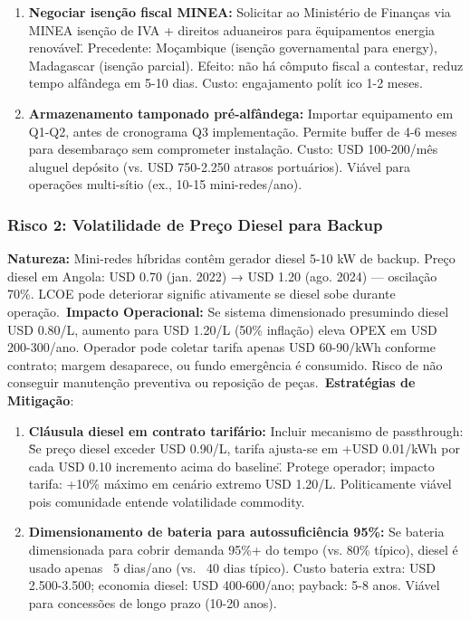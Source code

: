 \documentclass[12pt, a4paper]{article}
\begin{document}
\begin{enumerate}
\item\textbf{Negociar isenção fiscal MINEA:} Solicitar ao Ministério de Finanças via MINEA isenção de IVA + direitos aduaneiros para \"equipamentos energia renovável\". Precedente: Moçambique (isenção governamental para energy), Madagascar (isenção parcial). Efeito: não há cômputo fiscal a contestar, reduz tempo alfândega em 5-10 dias. Custo: engajamento polít ico 1-2 meses.\

\item\textbf{Armazenamento tamponado pré-alfândega:} Importar equipamento em Q1-Q2, antes de cronograma Q3 implementação. Permite buffer de 4-6 meses para desembaraço sem comprometer instalação. Custo: USD 100-200/mês aluguel depósito (vs. USD 750-2.250 atrasos portuários). Viável para operações multi-sítio (ex., 10-15 mini-redes/ano).\
\end{enumerate}

\subsubsection{Risco 2: Volatilidade de Preço Diesel para Backup}
\textbf{Natureza:} Mini-redes híbridas contêm gerador diesel 5-10 kW de backup. Preço diesel em Angola: USD 0.70 (jan. 2022) → USD 1.20 (ago. 2024) — oscilação 70\%. LCOE pode deteriorar signific ativamente se diesel sobe durante operação.\
\textbf{Impacto Operacional:} Se sistema dimensionado presumindo diesel USD 0.80/L, aumento para USD 1.20/L (50\% inflação) eleva OPEX em USD 200-300/ano. Operador pode coletar tarifa apenas USD 60-90/kWh conforme contrato; margem desaparece, ou fundo emergência é consumido. Risco de não conseguir manutenção preventiva ou reposição de peças.\
\textbf{Estratégias de Mitigação}:\
\begin{enumerate}
\item\textbf{Cláusula diesel em contrato tarifário:} Incluir mecanismo de passthrough: \"Se preço diesel exceder USD 0.90/L, tarifa ajusta-se em +USD 0.01/kWh por cada USD 0.10 incremento acima do baseline\". Protege operador; impacto tarifa: +10\% máximo em cenário extremo USD 1.20/L. Politicamente viável pois comunidade entende volatilidade commodity.\

\item\textbf{Dimensionamento de bateria para autossuficiência 95\%:} Se bateria dimensionada para cobrir demanda 95\%+ do tempo (vs. 80\% típico), diesel é usado apenas ~5 dias/ano (vs. ~40 dias típico). Custo bateria extra: USD 2.500-3.500; economia diesel: USD 400-600/ano; payback: 5-8 anos. Viável para concessões de longo prazo (10-20 anos).\
\end{enumerate}
\end{document}
